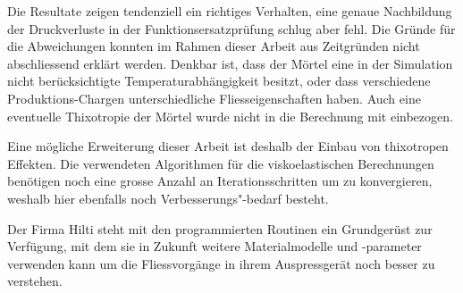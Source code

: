 Die Resultate zeigen tendenziell ein richtiges Verhalten, eine genaue Nachbildung der Druckverluste in der Funktionsersatzprüfung schlug aber fehl. Die Gründe für die Abweichungen konnten im Rahmen dieser Arbeit aus Zeitgründen nicht abschliessend erklärt werden. Denkbar ist, dass der Mörtel eine in der Simulation nicht berücksichtigte Temperaturabhängigkeit besitzt, oder dass verschiedene Produktions-Chargen unterschiedliche Fliesseigenschaften haben. Auch eine eventuelle Thixotropie der Mörtel wurde nicht in die Berechnung mit einbezogen.

Eine mögliche Erweiterung dieser Arbeit ist deshalb der Einbau von thixotropen Effekten.
Die verwendeten Algorithmen für die viskoelastischen Berechnungen benötigen noch eine grosse Anzahl an Iterationsschritten um zu konvergieren, weshalb hier ebenfalls noch Verbesserungs"-bedarf besteht.

Der Firma Hilti steht mit den programmierten Routinen ein Grundgerüst zur Verfügung, mit dem sie in Zukunft weitere Materialmodelle und -parameter verwenden kann um die Fliessvorgänge in ihrem Auspressgerät noch besser zu verstehen.
